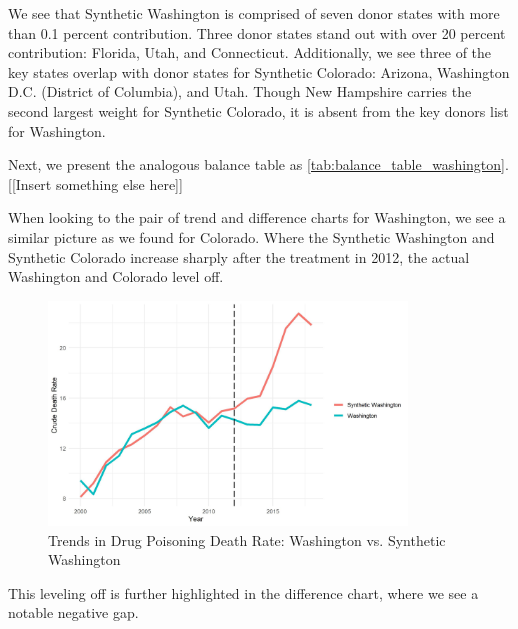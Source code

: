 \documentclass{article}
\begin{document}


We see that Synthetic Washington is comprised of seven donor states with more than 0.1 percent contribution. Three donor states stand out with over 20 percent contribution: Florida, Utah, and Connecticut. Additionally, we see three of the key states overlap with donor states for Synthetic Colorado: Arizona, Washington D.C. (District of Columbia), and Utah. Though New Hampshire carries the second largest weight for Synthetic Colorado, it is absent from the key donors list for Washington.

Next, we present the analogous balance table as \ref{tab:balance_table_washington}. [[Insert something else here]]



When looking to the pair of trend and difference charts for Washington, we see a similar picture as we found for Colorado. Where the Synthetic Washington and Synthetic Colorado increase sharply after the treatment in 2012, the actual Washington and Colorado level off.

\begin{figure}[H]
	\begin{center}
		\includegraphics[width=0.85\textwidth]{trends_plot_washington}
	\end{center}
	\caption{Trends in Drug Poisoning Death Rate: Washington vs. Synthetic Washington}
	\label{fig:trends_plot_washington}
\end{figure}

This leveling off is further highlighted in the difference chart, where we see a notable negative gap.
\end{document}
